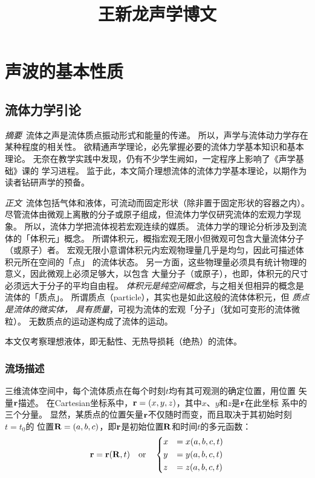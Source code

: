 \documentclass[UTF8]{ctexbook}
\title{王新龙声学博文}
\begin{document}
\maketitle

\tableofcontents

\chapter{声波的基本性质}
\section{流体力学引论}

\emph{摘要}\ 流体之声是流体质点振动形式和能量的传递。
所以，声学与流体动力学存在某种程度的相关性。
欲精通声学理论，必先掌握必要的流体力学基本知识和基本理论。
无奈在教学实践中发现，仍有不少学生阙如，一定程序上影响了《声学基础》课的
学习进程。
监于此，本文简介理想流体的流体力学基本理论，以期作为读者钻研声学的预备。

\emph{正文}\ 流体包括气体和液体，可流动而固定形状（除非置于固定形状的容器之内）。
尽管流体由微观上离散的分子或原子组成，但流体力学仅研究流体的宏观力学现象。
所以，流体力学把流体视若宏观连续的媒质。
流体力学的理论分析涉及到流体的「体积元」概念。
所谓体积元，概指宏观无限小但微观可包含大量流体分子（或原子）者。
宏观无限小意谓体积元内宏观物理量几乎是均匀，因此可描述体积元所在空间的「点」
的流体状态。
另一方面，这些物理量必须具有统计物理的意义，因此微观上必须足够大，以包含
大量分子（或原子），也即，体积元的尺寸必须远大于分子的平均自由程。
\emph{体积元是纯空间概念}，与之相关但相异的概念是流体的「质点」。
所谓质点（particle），其实也是如此这般的流体体积元，但\emph{
	质点是流体的微实体，
具有质量}，可视为流体的宏观「分子」（犹如可变形的流体微粒）。
无数质点的运动遂构成了流体的运动。

本文仅考察理想液体，即无黏性、无热导损耗（绝热）的流体。

\subsection{流场描述}
三维流体空间中，每个流体质点在每个时刻$t$均有其可观测的确定位置，用位置
矢量$\vb{r}$描述。
在Cartesian坐标系中，$\vb{r}=(x,y,z)$，其中$x$、$y$和$z$是$\vb{r}$在此坐标
系中的三个分量。
显然，某质点的位置矢量$\vb{r}$不仅随时而变，而且取决于其初始时刻$t=t_0$的
位置$\vb{R}=(a,b,c)$，即$\vb{r}$是初始位置$\vb{R}$和时间$t$的多元函数：
\begin{equation}
	\vb{r} = \vb{r}(\vb{R},t)\qor 
	\begin{dcases}
		x&=x(a,b,c,t)\\
		y&=y(a,b,c,t)\\
		z&=z(a,b,c,t)
	\end{dcases}
\end{equation}
\end{document}
